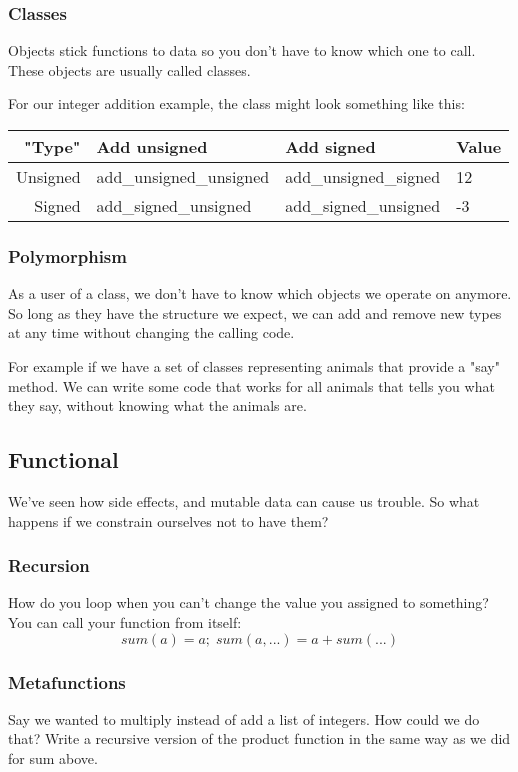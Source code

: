 \documentclass{article}
\begin{document}
\subsubsection{Classes}
Objects stick functions to data so you don't have to know which one to call.
These objects are usually called classes.

For our integer addition example, the class might look something like this:
\begin{table}[h]
\centering
\begin{tabular}{| r || l | l | l |}
\hline
"Type" & Add unsigned & Add signed & Value \\
\hline
Unsigned & add\_unsigned\_unsigned & add\_unsigned\_signed & 12 \\
Signed & add\_signed\_unsigned & add\_signed\_unsigned & -3 \\
\hline
\end{tabular}
\end{table}

\subsubsection{Polymorphism}
As a user of a class, we don't have to know which objects we operate on anymore.
So long as they have the structure we expect, we can add and remove new types
at any time without changing the calling code.

For example if we have a set of classes representing animals that provide a
"say" method. We can write some code that works for all animals that tells you
what they say, without knowing what the animals are.

\subsection{Functional}
We've seen how side effects, and mutable data can cause us trouble.
So what happens if we constrain ourselves not to have them?

\subsubsection{Recursion}
How do you loop when you can't change the value you assigned to something?
You can call your function from itself:
\begin{displaymath}
sum(a) = a ;\; sum(a, ...) = a + sum(...)
\end{displaymath}

\subsubsection{Metafunctions}
Say we wanted to multiply instead of add a list of integers.
How could we do that?
Write a recursive version of the product function in the same way as we did for
sum above.
\end{document}
